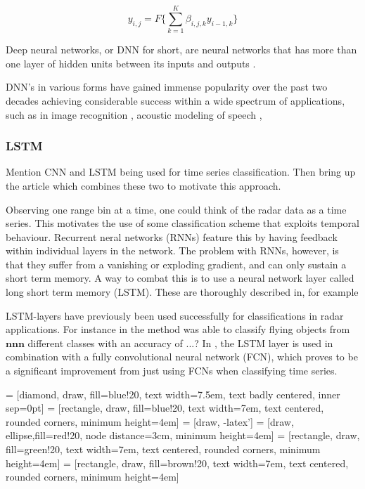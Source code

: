 \begin{equation}
	y_{i,j} = F\Big\{\sum_{k=1}^{K}\beta_{i,j,k}y_{i-1,k}\Big\}
\end{equation}




Deep neural networks, or DNN for short, are neural networks that has more than one layer of hidden units between its inputs and outputs \citep{hinton_deng_yu_dahl_mohamed_jaitly_senior_vanhoucke_nguyen_sainath_2012}. 


DNN's in various forms have gained immense popularity over the past two decades achieving considerable success within a wide spectrum of applications, such as in image recognition \citep{szegedy_liu_jia_sermanet_reed_anguelov_erhan_vanhoucke_rabinovich_2018}, acoustic modeling of speech \citep{hinton_deng_yu_dahl_mohamed_jaitly_senior_vanhoucke_nguyen_sainath_2012}, 

\subsubsection{LSTM}
Mention CNN and LSTM being used for time series classification. Then bring up the article which combines these two to motivate this approach.

Observing one range bin at a time, one could think of the radar data as a time series. This motivates the use of some classification scheme that exploits temporal behaviour. Recurrent neral networks (RNNs) feature this by having feedback within individual layers in the network. \citep{karim_majumdar_darabi_chen_2018} The problem with RNNs, however, is that they suffer from a vanishing or exploding gradient, and can only sustain a short term memory. A way to combat this is to use a neural network layer called long short term memory (LSTM). These are thoroughly described in, for example \citep{hochreiter_schmidhuber_1997}

LSTM-layers have previously been used successfully for classifications in radar applications. For instance in \citep{jithesh_sagayaraj_srinivasa_2018} the method was able to classify flying objects from $\textbf{nnn}$ different classes with an accuracy of ...? In \citep{karim_majumdar_darabi_chen_2018}, the LSTM layer is used in combination with a fully convolutional neural network (FCN), which proves to be a significant improvement from just using FCNs when classifying time series.

 = [diamond, draw, fill=blue!20, 
    text width=7.5em, text badly centered, inner sep=0pt]
 = [rectangle, draw, fill=blue!20, 
    text width=7em, text centered, rounded corners, minimum height=4em]
 = [draw, -latex']
 = [draw, ellipse,fill=red!20, node distance=3cm,
    minimum height=4em]
 = [rectangle, draw, fill=green!20, 
    text width=7em, text centered, rounded corners, minimum height=4em]
 = [rectangle, draw, fill=brown!20, 
    text width=7em, text centered, rounded corners, minimum height=4em]

